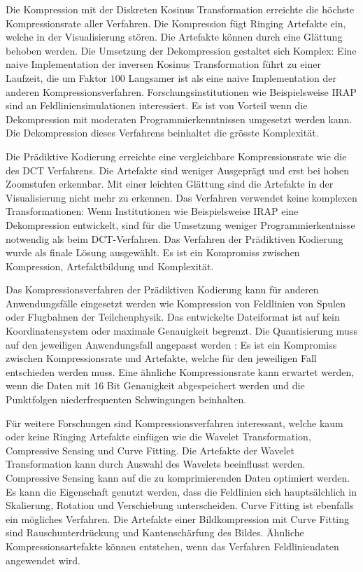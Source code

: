 Die Kompression mit der Diskreten Kosinus Transformation erreichte die höchste Kompressionsrate aller Verfahren. Die Kompression fügt Ringing Artefakte ein, welche in der Visualisierung stören. Die Artefakte können durch eine Glättung behoben werden. Die Umsetzung der Dekompression gestaltet sich Komplex: Eine naive Implementation der inversen Kosinus Transformation führt zu einer Laufzeit, die um Faktor $100$ Langsamer ist als eine naive Implementation der anderen Kompressionsverfahren. Forschungsinstitutionen wie Beispielsweise IRAP \cite{website:irap} sind an Feldliniensimulationen interessiert. Es ist von Vorteil wenn die Dekompression mit moderaten Programmierkenntnissen umgesetzt werden kann. Die Dekompression dieses Verfahrens beinhaltet die grösste Komplexität.

Die Prädiktive Kodierung erreichte eine vergleichbare Kompressionsrate wie die des DCT Verfahrens. Die Artefakte sind weniger Ausgeprägt und erst bei hohen Zoomstufen erkennbar. Mit einer leichten Glättung sind die Artefakte in der Visualisierung nicht mehr zu erkennen. Das Verfahren verwendet keine komplexen Transformationen: Wenn Institutionen wie Beispielsweise IRAP \cite{website:irap} eine Dekompression entwickelt, sind für die Umsetzung weniger Programmierkentnisse notwendig als beim DCT-Verfahren. Das Verfahren der Prädiktiven Kodierung wurde als finale Lösung ausgewählt. Es ist ein Kompromiss zwischen Kompression, Artefaktbildung und Komplexität.

Das Kompressionsverfahren der Prädiktiven Kodierung kann für anderen Anwendungsfälle eingesetzt werden wie Kompression von Feldlinien von Spulen oder Flugbahnen der Teilchenphysik. Das entwickelte Dateiformat ist auf kein Koordinatensystem oder maximale Genauigkeit begrenzt. Die Quantisierung muss auf den jeweiligen Anwendungsfall angepasst werden : Es ist ein Kompromiss zwischen Kompressionsrate und Artefakte, welche für den jeweiligen Fall entschieden werden muss. Eine ähnliche Kompressionsrate kann erwartet werden, wenn die Daten mit 16 Bit Genauigkeit abgespeichert werden und die Punktfolgen niederfrequenten Schwingungen beinhalten.

Für weitere Forschungen sind Kompressionsverfahren interessant, welche kaum oder keine Ringing Artefakte einfügen wie die Wavelet Transformation, Compressive Sensing und Curve Fitting. Die Artefakte der Wavelet Transformation kann durch Auswahl des Wavelets beeinflusst werden. Compressive Sensing kann auf die zu komprimierenden Daten optimiert werden. Es kann die Eigenschaft genutzt werden, dass die Feldlinien sich hauptsälchlich in Skalierung, Rotation und Verschiebung unterscheiden. Curve Fitting ist ebenfalls ein mögliches Verfahren. Die Artefakte einer Bildkompression mit Curve Fitting sind Rauschunterdrückung und Kantenschärfung des Bildes. Ähnliche Kompressionsartefakte können entstehen, wenn das Verfahren Feldliniendaten angewendet wird.

